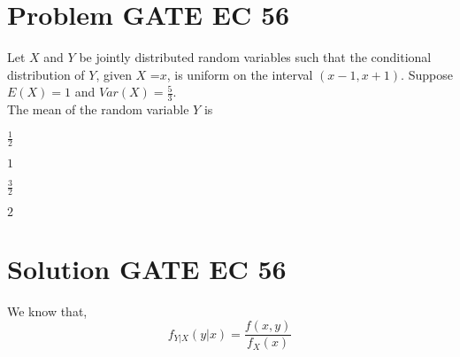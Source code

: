 \documentclass[journal,12pt,twocolumn]{IEEEtran}
\begin{document}
\section{Problem GATE EC 56}
Let $X$ and $Y$ be jointly distributed random variables such that the conditional distribution of $Y$, given $X$ =$x$, is uniform on the interval $(x-1,x+1)$. Suppose $E(X)=1$ and $Var(X)=\frac{5}{3}$.
\\
 The mean of the random variable $Y$ is 
\\
\begin{enumerate}[(A)]
\begin{multicols}{2}
\setlength\itemsep{1em}

\item $ \frac{1}{2}$\\
\item $1$\\
\item $ \frac{3}{2}$\\
\item $2$

\end{multicols}
\end{enumerate}
\section{Solution GATE EC 56}
We know that,
\begin{equation}
    f_{Y|X}(y|x)=\frac{f(x,y)}{f_{X}(x)} \label{eq:2.0.1}
\end{equation}
\end{document}
